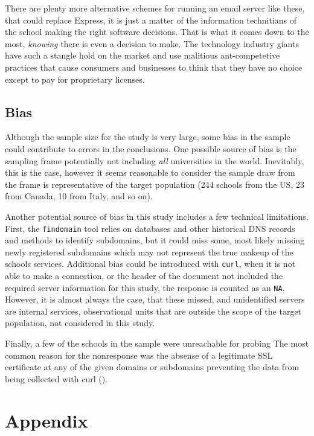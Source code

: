 \documentclass{article}
\theoremstyle{definition}
\begin{document}
\begin{flushleft}
\begin{multicols}{2}
There are plenty more alternative schemes for running an email server like
these, that could replace Express, it is just a matter of
the information technitians of the school making the right software
decisions. That is what it comes down to the most, \textit{knowing}
there is even a decision to make. The technology industry giants have
such a stangle hold on the market and use malitious ant-competetive
practices that cause consumers and businesses to think that they have
no choice except to pay for proprietary licenses.

\subsection{Bias}
Although the sample size for the study is very large, some bias in the sample
could contribute to errors in the conclusions. One possible source of bias
is the sampling frame potentially not including \textit{all} universities in
the world. Inevitably, this is the case, however it seems reasonable to consider
the sample draw from the frame is representative of the target population
(244 schools from the US, 23 from Canada, 10 from Italy, and so on).

Another potential source of bias in this study includes a few technical
limitations. First, the \texttt{findomain} tool relies on databases and
other historical DNS records and methods to identify subdomains, but it
could miss some, most likely missing newly registered subdomains which
may not represent the true makeup of the schools services. Additional
bias could be introduced with \texttt{curl}, when it is not able
to make a connection, or the header of the document not included the required
server information for this study, the response is counted as an \texttt{NA}.
However, it is almost always the case, that these
missed, and unidentified servers are internal services, observational units that
are outside the scope of the target population, not considered in this study.

Finally, a few of the schools in the sample were unreachable for probing
The most common reason for the nonresponse was the absense of a
legitimate SSL certificate at any of the given domains or subdomains
preventing the data from being collected with curl
(\cite{curlSSL}).



\end{multicols}
\end{flushleft}
\printbibliography
\section{Appendix}
\end{document}
